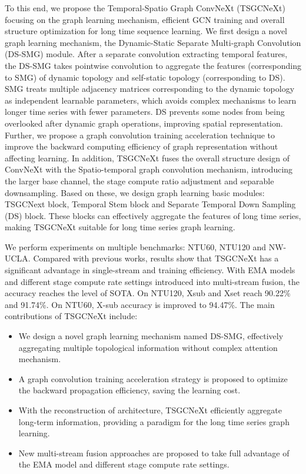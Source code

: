 \documentclass[10pt,twocolumn,letterpaper]{article}
\begin{document}
To this end, we propose the Temporal-Spatio Graph ConvNeXt (TSGCNeXt) focusing on the graph learning mechanism, efficient GCN training and overall structure optimization for long time sequence learning. We first design a novel graph learning mechanism, the Dynamic-Static Separate Multi-graph Convolution (DS-SMG) module. After a separate convolution extracting temporal features, the DS-SMG takes pointwise convolution to aggregate the features (corresponding to SMG) of dynamic topology and self-static topology (corresponding to DS). SMG treats multiple adjacency matrices corresponding to the dynamic topology as independent learnable parameters, which avoids complex mechanisms to learn longer time series with fewer parameters. DS prevents some nodes from being overlooked after dynamic graph operations, improving spatial representation. Further, we propose a graph convolution training acceleration technique to improve the backward computing efficiency of graph representation without affecting learning. In addition, TSGCNeXt fuses the overall structure design of ConvNeXt with the Spatio-temporal graph convolution mechanism, introducing the larger base channel, the stage compute ratio adjustment and separable downsampling. Based on these, we design graph learning basic modules: TSGCNext block, Temporal Stem block and Separate Temporal Down Sampling (DS) block. These blocks can effectively aggregate the features of long time series, making TSGCNeXt suitable for long time series graph learning.

We perform experiments on multiple benchmarks: NTU60, NTU120 and NW-UCLA. Compared with previous works, results show that TSGCNeXt has a significant advantage in single-stream and training efficiency. With EMA models and different stage compute rate settings introduced into multi-stream fusion, the accuracy reaches the level of SOTA. On NTU120, Xsub and Xset reach 90.22\% and 91.74\%. On NTU60, X-sub accuracy is improved to 94.47\%. The main contributions of TSGCNeXt include:
\begin{itemize}
\item We design a novel graph learning mechanism named DS-SMG, effectively aggregating multiple topological information without complex attention mechanism.
\item A graph convolution training acceleration strategy is proposed to optimize the backward propagation efficiency, saving the learning cost.
\item With the reconstruction of architecture, TSGCNeXt efficiently aggregate long-term information, providing a paradigm for the long time series graph learning.
\item New multi-stream fusion approaches are proposed to take full advantage of the EMA model and different stage compute rate settings.
\end{itemize}
\end{document}
